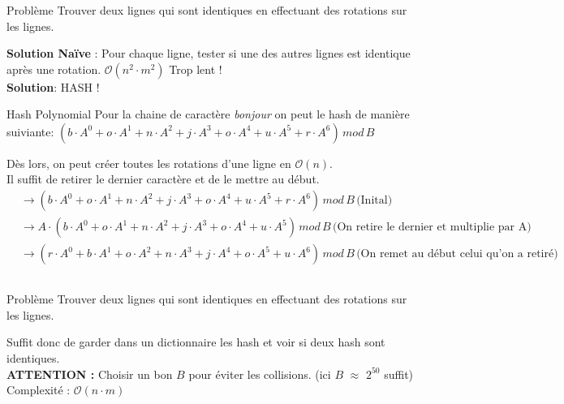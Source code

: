 \begin{frame}
    \frametitle{\problemtitle}
        \begin{block}
            {Problème} Trouver deux lignes qui sont identiques en effectuant des rotations sur les lignes.
        \end{block}
        \pause
        \textbf{Solution Naïve} : Pour chaque ligne, tester si une des autres lignes est identique après une rotation. $\mathcal O(n^2 \cdot m^2)$ Trop lent !\\
        \pause
        \textbf{Solution}: HASH !
        \begin{block} {Hash Polynomial}
            Pour la chaine de caractère \textit{bonjour} on peut le hash de manière suiviante:
            $(b \cdot A^0 + o \cdot A^1 + n \cdot A^2 + j \cdot A^3 + o \cdot A^4 + u \cdot A^5 + r \cdot A^6) \, mod \, B$
        \end{block}
        \pause
        Dès lors, on peut créer toutes les rotations d'une ligne en $\mathcal O(n)$.\\
        Il suffit de retirer le dernier caractère et de le mettre au début.
        \pause
        \begin{align*}
           &\rightarrow (b \cdot A^0 + o \cdot A^1 + n \cdot A^2 + j \cdot A^3 + o \cdot A^4 + u \cdot A^5 + r \cdot A^6) \, mod \, B \,\text{(Inital)}\\
           &\rightarrow A \cdot (b \cdot A^0 + o \cdot A^1 + n \cdot A^2 + j \cdot A^3 + o \cdot A^4 + u \cdot A^5) \, mod \, B\, \text{(On retire le dernier et multiplie par A)}\\
           &\rightarrow (r \cdot A^0 + b \cdot A^1 + o \cdot A^2 + n \cdot A^3 + j \cdot A^4 + o \cdot A^5 + u \cdot A^6) \, mod \, B\, \text{(On remet au début celui qu'on a retiré)}\\
        \end{align*}
        \pause
\end{frame}
\begin{frame}
    \frametitle{\problemtitle}
        \begin{block}
            {Problème} Trouver deux lignes qui sont identiques en effectuant des rotations sur les lignes.
        \end{block}
    Suffit donc de garder dans un dictionnaire les hash et voir si deux hash sont identiques.\\
    \textbf{ATTENTION :} Choisir un bon $B$ pour éviter les collisions. (ici $B$ $\approx$ $2^{50}$ suffit)\\
    \pause
    Complexité : $\mathcal O(n \cdot m)$
    \pause\solvestats
\end{frame}
